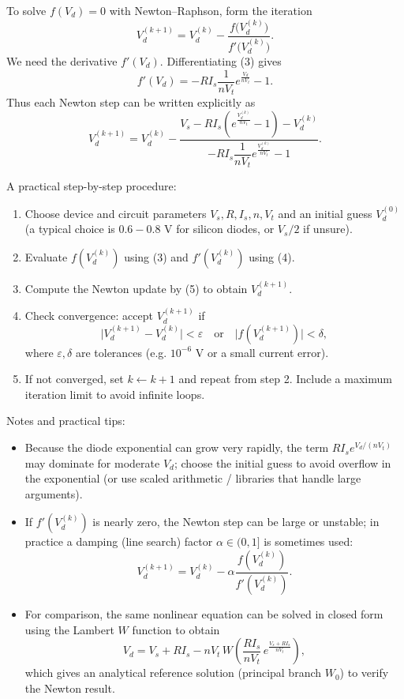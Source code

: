 \documentclass[a4paper,12pt]{article}
\begin{document}
To solve \(f(V_d)=0\) with Newton–Raphson, form the iteration
\begin{equation}
V_{d}^{(k+1)} = V_{d}^{(k)} - \frac{f\bigl(V_{d}^{(k)}\bigr)}{f'\bigl(V_{d}^{(k)}\bigr)}.
\end{equation}
We need the derivative \(f'(V_d)\). Differentiating (3) gives
\begin{equation}
f'(V_d) = -R I_s \frac{1}{nV_t} e^{\frac{V_d}{nV_t}} - 1.
\end{equation}
Thus each Newton step can be written explicitly as
\begin{equation}
V_{d}^{(k+1)} = V_{d}^{(k)} - \frac{V_s - R I_s\!\left(e^{\frac{V_{d}^{(k)}}{nV_t}} - 1\right) - V_{d}^{(k)}}
{-R I_s \dfrac{1}{nV_t} e^{\frac{V_{d}^{(k)}}{nV_t}} - 1}.
\end{equation}

A practical step-by-step procedure:
\begin{enumerate}
\item Choose device and circuit parameters \(V_s, R, I_s, n, V_t\) and an initial guess \(V_d^{(0)}\) (a typical choice is \(0.6\!-\!0.8\) V for silicon diodes, or \(V_s/2\) if unsure).
\item Evaluate \(f(V_d^{(k)})\) using (3) and \(f'(V_d^{(k)})\) using (4).
\item Compute the Newton update by (5) to obtain \(V_d^{(k+1)}\).
\item Check convergence: accept \(V_d^{(k+1)}\) if
\begin{equation}
\bigl|V_d^{(k+1)}-V_d^{(k)}\bigr| < \varepsilon
\quad\text{or}\quad
\bigl|f(V_d^{(k+1)})\bigr| < \delta,
\end{equation}
where \(\varepsilon,\delta\) are tolerances (e.g. \(10^{-6}\) V or a small current error).
\item If not converged, set \(k\leftarrow k+1\) and repeat from step 2. Include a maximum iteration limit to avoid infinite loops.
\end{enumerate}

Notes and practical tips:
\begin{itemize}
\item Because the diode exponential can grow very rapidly, the term \(R I_s e^{V_d/(nV_t)}\) may dominate for moderate \(V_d\); choose the initial guess to avoid overflow in the exponential (or use scaled arithmetic / libraries that handle large arguments).
\item If \(f'(V_d^{(k)})\) is nearly zero, the Newton step can be large or unstable; in practice a damping (line search) factor \(\alpha\in(0,1]\) is sometimes used:
\[
V_d^{(k+1)} = V_d^{(k)} - \alpha\frac{f(V_d^{(k)})}{f'(V_d^{(k)})}.
\]
\item For comparison, the same nonlinear equation can be solved in closed form using the Lambert \(W\) function to obtain
\begin{equation}
V_d = V_s + R I_s - nV_t \, W\!\left(\frac{R I_s}{nV_t}\,e^{\frac{V_s+R I_s}{nV_t}}\right),
\end{equation}
which gives an analytical reference solution (principal branch \(W_0\)) to verify the Newton result.
\end{itemize}
\end{document}
